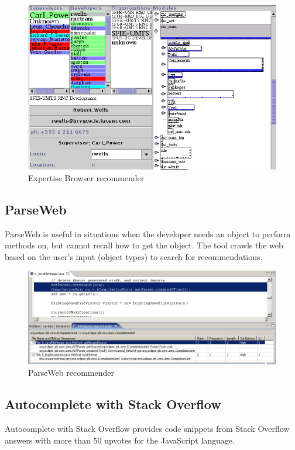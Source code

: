 \documentclass{l4proj}
\begin{document}
\begin{figure}[H]
\includegraphics[scale=0.4]{expertise}
\centering
\caption{Expertise Browser recommender}\label{expertise}
\label{fig:expertise}
\end{figure}

\subsection{ParseWeb}
ParseWeb \cite{parseweb} is useful in situations when the developer needs an object to perform methods on, but cannot recall how to get the object. The tool crawls the web based on the user's input (object types) to search for recommendations.

\begin{figure}[H]
\includegraphics[scale=0.5]{parseweb}
\centering
\caption{ParseWeb recommender}\label{parseweb}
\label{fig:parseweb}
\end{figure}

\subsection{Autocomplete with Stack Overflow}
Autocomplete with Stack Overflow \cite{autocomplete-so} provides code snippets from Stack Overflow answers with more than 50 upvotes for the JavaScript language.
\end{document}
